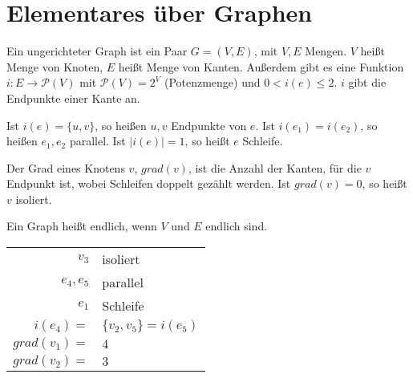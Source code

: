 
\section{Elementares über Graphen}


\begin{definition}
	Ein ungerichteter Graph ist ein Paar $G = (V,E)$, mit $V, E$ Mengen. $V$ heißt Menge von Knoten, $E$ heißt Menge von Kanten. Außerdem gibt es eine Funktion $i: E \rightarrow \mathcal{P}(V)$ mit $\mathcal{P}(V) = 2^V$ (Potenzmenge) und $0 < i(e) \leq 2$. $i$ gibt die Endpunkte einer Kante an.
	
	Ist $i(e) = \{ u, v \}$, so heißen $u, v$ Endpunkte von $e$. Ist $i(e_1) = i(e_2)$, so heißen $e_1, e_2$ parallel. Ist $|i(e)| = 1$, so heißt $e$ Schleife.
	
	Der Grad eines Knotens $v$, $grad(v)$, ist die Anzahl der Kanten, für die $v$ Endpunkt ist, wobei Schleifen doppelt gezählt werden. Ist $grad(v) = 0$, so heißt $v$ isoliert.
	
	Ein Graph heißt endlich, wenn $V$ und $E$ endlich sind.
\end{definition}


\begin{beispiel}
	\qquad
	\vspace{2mm}
	
	\begin{minipage}{8cm}
	\end{minipage}
	\begin{minipage}{5cm}	
	\begin{tabular}[t]{rl}
		$v_3$ & isoliert \\
		$e_4, e_5$ & parallel \\
		$e_1$ & Schleife \\
		$i(e_4) =$& $ \{ v_2, v_5 \} = i(e_5)$\\
		$grad(v_1) =$& $4$ \\
		$grad(v_2) =$& $3$ \\
	\end{tabular}
	\end{minipage}
\end{beispiel}


